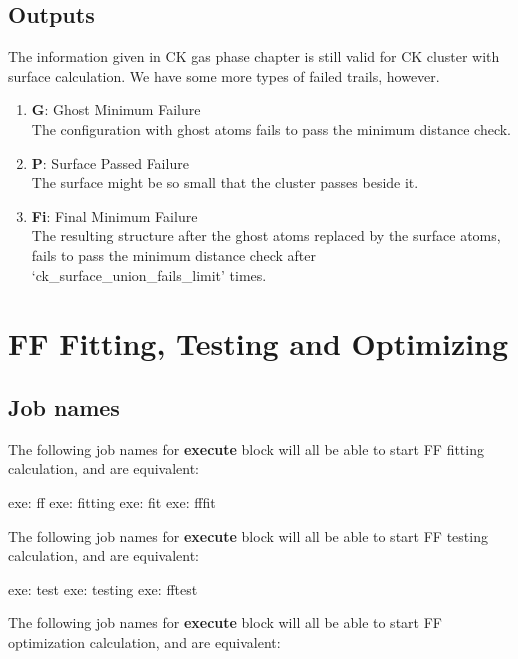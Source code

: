 \documentclass[11pt]{book}
\begin{document}
\section{Outputs}

The information given in CK gas phase chapter is still valid for CK cluster with surface calculation. We have some more types of failed trails, 
however.

	\begin{enumerate}
	\item \textbf{G}: Ghost Minimum Failure \\
		The configuration with ghost atoms fails to pass the minimum distance check.
	\item \textbf{P}: Surface Passed Failure \\
		The surface might be so small that the cluster passes beside it.
	\item \textbf{Fi}: Final Minimum Failure \\
		The resulting structure after the ghost atoms replaced by the surface atoms, fails to pass the minimum distance check after 
		`ck\_surface\_union\_fails\_limit' times.
	\end{enumerate}

\chapter{FF Fitting, Testing and Optimizing}


\section{Job names}

The following job names for \textbf{execute} block will all be able to start FF fitting calculation, and are equivalent:

\begin{everbatim}
{ exe: ff }
{ exe: fitting }
{ exe: fit }
{ exe: fffit }
\end{everbatim}

The following job names for \textbf{execute} block will all be able to start FF testing calculation, and are equivalent:

\begin{everbatim}
{ exe: test }
{ exe: testing }
{ exe: fftest }
\end{everbatim}

The following job names for \textbf{execute} block will all be able to start FF optimization calculation, and are equivalent:
\end{document}
